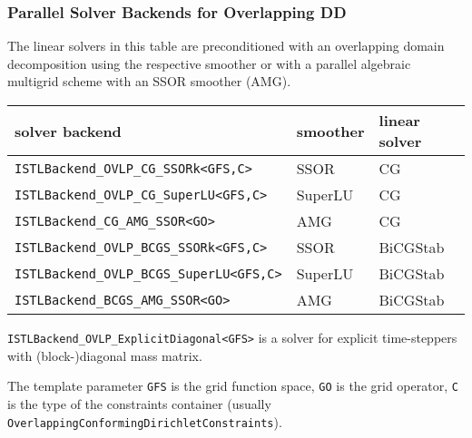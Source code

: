 \begin{frame}
  \frametitle{Parallel Solver Backends for Overlapping DD}
The linear solvers in this table are preconditioned with an overlapping domain decomposition
using the respective smoother or with a parallel algebraic multigrid scheme with an SSOR smoother (AMG).
\begin{center}
\begin{tabular}{|l|l|l|}\hline
solver backend & smoother & linear solver\\\hline
\lstinline!ISTLBackend_OVLP_CG_SSORk<GFS,C>! & SSOR & CG\\\hline
\lstinline!ISTLBackend_OVLP_CG_SuperLU<GFS,C>! & SuperLU & CG\\\hline
\lstinline!ISTLBackend_CG_AMG_SSOR<GO>! & AMG & CG\\\hline
\lstinline!ISTLBackend_OVLP_BCGS_SSORk<GFS,C>! & SSOR & BiCGStab\\\hline
\lstinline!ISTLBackend_OVLP_BCGS_SuperLU<GFS,C>! & SuperLU & BiCGStab\\\hline
\lstinline!ISTLBackend_BCGS_AMG_SSOR<GO>! & AMG & BiCGStab\\\hline
\end{tabular}
\end{center}
\lstinline!ISTLBackend_OVLP_ExplicitDiagonal<GFS>! is a solver for explicit
time-steppers with (block-)diagonal mass matrix.

The template parameter \lstinline!GFS! is the grid function space, \lstinline!GO! is the grid operator, \lstinline!C! is the type of the
constraints container (usually \lstinline!OverlappingConformingDirichletConstraints!).
\end{frame}

